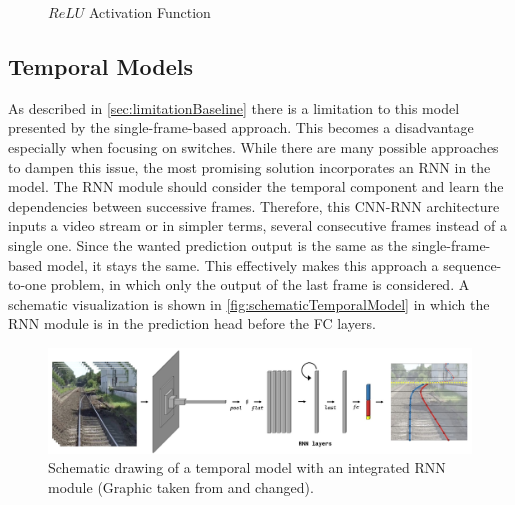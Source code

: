 \begin{figure}[H]
    \centering
    \caption{$ReLU$ Activation Function \cite{pytorch_relu_docu}}
    \label{fig:ReLU}
\end{figure}

\subsection{Temporal Models}
\label{sec:temporalModels}

As described in \autoref{sec:limitationBaseline} there is a limitation to this model presented by the single-frame-based approach.
This becomes a disadvantage especially when focusing on switches.
While there are many possible approaches to dampen this issue, the most promising solution incorporates an \ac{RNN} in the model.
The \ac{RNN} module should consider the temporal component and learn the dependencies between successive frames.
Therefore, this \ac{CNN}-\ac{RNN} architecture inputs a video stream or in simpler terms, several consecutive frames instead of a single one.
Since the wanted prediction output is the same as the single-frame-based model, it stays the same.
This effectively makes this approach a sequence-to-one problem, in which only the output of the last frame is considered.
A schematic visualization is shown in \autoref{fig:schematicTemporalModel} in which the \ac{RNN} module is in the prediction head before the \ac{FC} layers.

\begin{figure}[H]
    \centering
    \includegraphics[width=\linewidth]{PICs//temporalModels/schematicDrawing.jpg}
    \caption{Schematic drawing of a temporal model with an integrated \ac{RNN} module (Graphic taken from \cite{tepNet2024} and changed).}
    \label{fig:schematicTemporalModel}
\end{figure}

